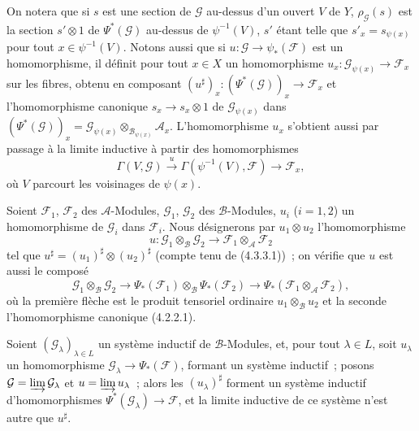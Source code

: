 \begin{env}[4.4.3]
On notera que si $s$ est une section de $\mathcal{G}$ au-dessus d'un ouvert
$V$ de $Y$, $\rho_{\mathcal{G}}(s)$ est la section $s'\otimes1$ de
$\Psi^*(\mathcal{G})$ au-dessus de $\psi^{-1}(V)$, $s'$ étant telle que
$s'_x=s_{\psi(x)}$ pour tout $x\in\psi^{-1}(V)$. Notons aussi que si
$u:\mathcal{G}\to\psi_*(\mathcal{F})$ est un homomorphisme, il définit pour
tout $x\in X$ un homomorphisme
$u_x:\mathcal{G}_{\psi(x)}\to\mathcal{F}_x$ sur les fibres, obtenu en
composant
$(u^\sharp)_x:(\Psi^*(\mathcal{G}))_x\to\mathcal{F}_x$ et l'homomorphisme
canonique $s_x\to s_x\otimes1$ de $\mathcal{G}_{\psi(x)}$ dans
$(\Psi^*(\mathcal{G}))_x
=\mathcal{G}_{\psi(x)}\otimes_{\mathcal{B}_{\psi(x)}}\mathcal{A}_x$.
L'homomorphisme $u_x$ s'obtient aussi par passage à la limite inductive à
partir des homomorphismes
\[
  \Gamma(V,\mathcal{G})\xrightarrow{u}
  \Gamma(\psi^{-1}(V),\mathcal{F})\longrightarrow\mathcal{F}_x,
\]
où $V$ parcourt les voisinages de $\psi(x)$.
\end{env}

\begin{env}[4.4.4]
\label{0.4.4.4-fr}
Soient $\mathcal{F}_1$, $\mathcal{F}_2$ des $\mathcal{A}$-Modules,
$\mathcal{G}_1$, $\mathcal{G}_2$ des $\mathcal{B}$-Modules, $u_i$ ($i=1,2$)
un homomorphisme de $\mathcal{G}_i$ dans $\mathcal{F}_i$. Nous désignerons par
$u_1\otimes u_2$ l'homomorphisme
\[
  u:\mathcal{G}_1\otimes_{\mathcal{B}}\mathcal{G}_2
  \longrightarrow
  \mathcal{F}_1\otimes_{\mathcal{A}}\mathcal{F}_2
\]
tel que $u^\sharp=(u_1)^\sharp\otimes(u_2)^\sharp$ (compte tenu de
(4.3.3.1))~; on vérifie que $u$ est aussi le composé
\[
  \mathcal{G}_1\otimes_{\mathcal{B}}\mathcal{G}_2
  \longrightarrow
  \Psi_*(\mathcal{F}_1)\otimes_{\mathcal{B}}\Psi_*(\mathcal{F}_2)
  \longrightarrow
  \Psi_*(\mathcal{F}_1\otimes_{\mathcal{A}}\mathcal{F}_2),
\]
où la première flèche est le produit tensoriel ordinaire
$u_1\otimes_{\mathcal{B}}u_2$ et la seconde l'homomorphisme canonique
(4.2.2.1).
\end{env}

\begin{env}[4.4.5]
\label{0.4.4.5-fr}
Soient $(\mathcal{G}_\lambda)_{\lambda\in L}$ un système inductif de
$\mathcal{B}$-Modules, et, pour tout $\lambda\in L$, soit $u_\lambda$ un
homomorphisme $\mathcal{G}_\lambda\to\Psi_*(\mathcal{F})$, formant un système
inductif~; posons
$\mathcal{G}=\varinjlim\mathcal{G}_\lambda$ et
$u=\varinjlim u_\lambda$~; alors les $(u_\lambda)^\sharp$ forment un système
inductif d'homomorphismes $\Psi^*(\mathcal{G}_\lambda)\to\mathcal{F}$, et la
limite inductive de ce système n'est autre que $u^\sharp$.
\end{env}

